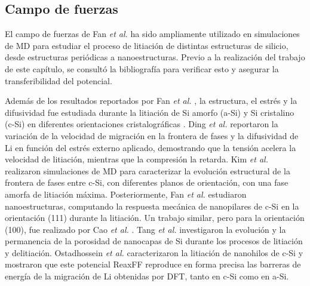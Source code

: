 \subsection{Campo de fuerzas}

El campo de fuerzas de Fan \textit{et al.} ha sido ampliamente utilizado en 
simulaciones de MD para estudiar el proceso de litiación de distintas estructuras
de silicio, desde estructuras periódicas a nanoestructuras. Previo a la 
realización del trabajo de este capítulo, se consultó la bibliografía para 
verificar esto y asegurar la transferibilidad del potencial. 

Además de los resultados reportados por Fan \textit{et al.} \cite{fan2013}, 
la estructura, el estrés y la difusividad fue estudiada durante la litiación de 
Si amorfo (a-Si) y Si cristalino (c-Si) en diferentes orientaciones 
cristalográficas \cite{chen2020, kim2015}. Ding \textit{et al.} \cite{ding2017} 
reportaron la variación de la velocidad de migración en la frontera de fases y la 
difusividad de Li en función del estrés externo aplicado, demostrando que la 
tensión acelera la velocidad de litiación, mientras que la compresión la retarda. 
Kim \textit{et al.} \cite{kim2014} realizaron simulaciones de MD para caracterizar 
la evolución estructural de la frontera de fases entre c-Si, con diferentes planos 
de orientación, con una fase amorfa de litiación máxima. Posteriormente, Fan 
\textit{et al.} \cite{fan2018} estudiaron nanoestructuras, computando la respuesta
mecánica de nanopilares de c-Si en la orientación (111) durante la litiación.
Un trabajo similar, pero para la orientación (100), fue realizado por Cao 
\textit{et al.} \cite{cao2019}. Tang \textit{et al.} \cite{tang2019} investigaron
la evolución y la permanencia de la porosidad de nanocapas de Si durante los 
procesos de litiación y delitiación. Ostadhossein \textit{et al.} 
\cite{ostadhossein2015} caracterizaron la litiación de nanohilos de c-Si y mostraron
que este potencial ReaxFF reproduce en forma precisa las barreras de energía de 
la migración de Li obtenidas por DFT, tanto en c-Si como en a-Si.


